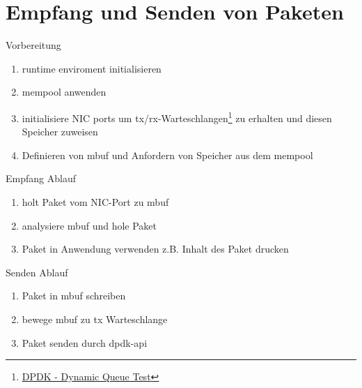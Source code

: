 \documentclass{beamer}
\begin{document}
\section{Empfang und Senden von Paketen}
\begin{frame}{Vorbereitung}
    \begin{enumerate}
        \item runtime enviroment initialisieren
        \item mempool anwenden
        \item initialisiere NIC ports um tx/rx-Warteschlangen\footnote{\href{https://doc.dpdk.org/dts/test_plans/dynamic_queue_test_plan.html}{DPDK - Dynamic Queue Test}} zu erhalten und diesen Speicher zuweisen
        \item Definieren von mbuf und Anfordern von Speicher aus dem mempool
    \end{enumerate}
\end{frame}

\begin{frame}{Empfang Ablauf}
    \begin{enumerate}
        \item holt Paket vom NIC-Port zu mbuf
        \item analysiere mbuf und hole Paket
        \item Paket in Anwendung verwenden z.B. Inhalt des Paket drucken
    \end{enumerate}
\end{frame}

\begin{frame}{Senden Ablauf}
    \begin{enumerate}
        \item Paket in mbuf schreiben
        \item bewege mbuf zu tx Warteschlange
        \item Paket senden durch dpdk-api
    \end{enumerate}
\end{frame}
\end{document}
